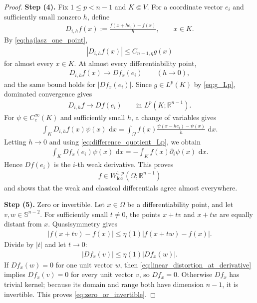 \documentclass[10pt,a4paper]{amsart}
\newcommand{\R}{\mathbb R}
\newcommand{\dd}{\,\mathrm{d}}
\begin{document}
\begin{proof}
\textbf{Step (4).} Fix \(1\leq p<n-1\) and \(K\Subset V\).  For a coordinate vector \(e_i\)
and sufficiently small nonzero \(h\), define
\begin{align}
D_{i,h}f(x)
:=
\frac{f(x+he_i)-f(x)}{h},
\qquad x\in K.\nonumber
\end{align}
By \eqref{eq:hajlasz_one_point},
\begin{align}
|D_{i,h}f(x)|\leq C_{n-1,\eta}g(x)\nonumber
\end{align}
for almost every \(x\in K\).  At almost every differentiability point,
\begin{align}
D_{i,h}f(x)\longrightarrow Df_x(e_i)
\qquad(h\to0),\nonumber
\end{align}
and the same bound holds for \(|Df_x(e_i)|\).  Since \(g\in L^p(K)\) by \eqref{eq:g_Lp},
dominated convergence gives
\begin{align}
D_{i,h}f
\longrightarrow
Df(e_i)
\qquad
\text{in }L^p(K;\R^{n-1}).
\label{eq:difference_quotient_Lp}
\end{align}
For \(\psi\in C_c^\infty(K)\) and sufficiently small \(h\), a change of
variables gives
\begin{align}
\int_KD_{i,h}f(x)\psi(x)\,\dd x
=
\int_\Omega
f(x)
\frac{\psi(x-he_i)-\psi(x)}{h}
\,\dd x.\nonumber
\end{align}
Letting \(h\to0\) and using \eqref{eq:difference_quotient_Lp}, we obtain
\begin{align}
\int_KDf_x(e_i)\psi(x)\,\dd x
=
-\int_Kf(x)\partial_i\psi(x)\,\dd x.\nonumber
\end{align}
Hence \(Df(e_i)\) is the \(i\)-th weak derivative.  This proves
\begin{align}
f\in W^{1,p}_{\mathrm{loc}}(\Omega;\R^{n-1})\nonumber
\end{align}
and shows that the weak and classical differentials agree almost
everywhere.

\textbf{Step (5).} Zero or invertible.
Let \(x\in\Omega\) be a differentiability point, and let
\(v,w\in\mathbb S^{n-2}\).  For sufficiently small \(t\neq0\), the points
\(x+tv\) and \(x+tw\) are equally distant from \(x\).  Quasisymmetry gives
\begin{align}
|f(x+tv)-f(x)|
\leq
\eta(1)|f(x+tw)-f(x)|.\nonumber
\end{align}
Divide by \(|t|\) and let \(t\to0\):
\begin{align}
|Df_x(v)|
\leq
\eta(1)|Df_x(w)|.
\label{eq:linear_distortion_at_derivative}
\end{align}
If \(Df_x(w)=0\) for one unit vector \(w\), then
\eqref{eq:linear_distortion_at_derivative} implies \(Df_x(v)=0\) for every
unit vector \(v\), so \(Df_x=0\).  Otherwise \(Df_x\) has trivial kernel;
because its domain and range both have dimension \(n-1\), it is invertible.
This proves \eqref{eq:zero_or_invertible}.
\end{proof}
\end{document}
